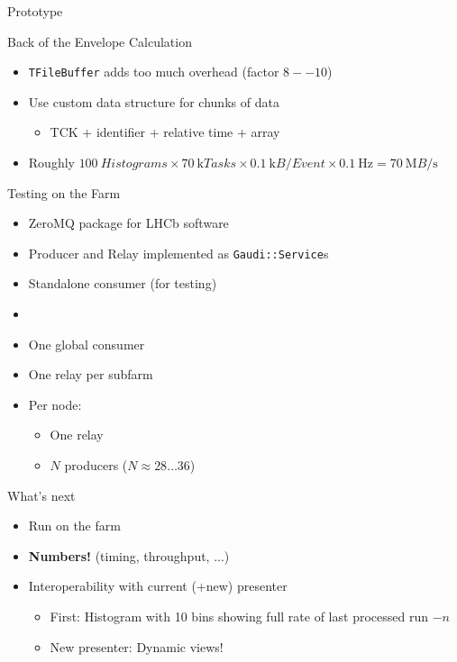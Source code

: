 \documentclass[aspectratio=1610,compress,titleprogressbar]{beamer}
\begin{document}
\begin{frame}{Prototype}
  \begin{block}{Back of the Envelope Calculation}
    \begin{itemize}
      \item \texttt{TFileBuffer} adds too much overhead (factor $8 -- 10$)
      \item Use custom data structure for chunks of data \begin{itemize}
        \item TCK + identifier + relative time + array
      \end{itemize}
      \item Roughly $\SI{100}{Histograms} \times \SI{70}{\kilo Tasks} \times \SI{0.1}{\kilo B\per Event} \times \SI{0.1}{\hertz} = \SI{70}{\mega B\per\second}$
    \end{itemize}
  \end{block}
\end{frame}

\begin{frame}{Testing on the Farm}
  \begin{itemize}
    \item ZeroMQ package for LHCb software
    \item Producer and Relay implemented as \texttt{Gaudi::Service}s
    \item Standalone consumer (for testing)
    \item [] {}
    \item One global consumer
    \item One relay per subfarm
    \item Per node: \begin{itemize}
      \item One relay
      \item $N$ producers ($N \approx 28 \dots 36$)
    \end{itemize}
  \end{itemize}
\end{frame}

\begin{frame}{What's next}
  \begin{itemize}
    \item Run on the farm
    \item \textbf{Numbers!} (timing, throughput, ...)
    \item Interoperability with current (+new) presenter \begin{itemize}
      \item First: Histogram with 10 bins showing full rate of last processed run $-n$
      \item New presenter: Dynamic views!
    \end{itemize}
  \end{itemize}
\end{frame}
\end{document}
